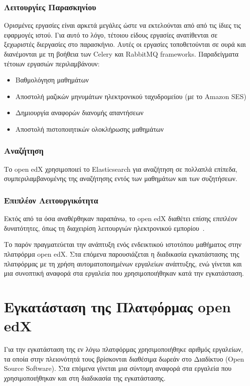 \documentclass[12pt]{report}
\begin{document}
\subsection{Λειτουργίες Παρασκηνίου}
Ορισμένες εργασίες είναι αρκετά μεγάλες ώστε να εκτελούνται από από τις ίδιες τις εφαρμογές ιστού. Για αυτό το λόγο, τέτοιου είδους εργασίες ανατίθενται σε ξεχωριστές διεργασίες στο παρασκήνιο. Αυτές οι εργασίες τοποθετούνται σε ουρά και διανέμονται με τη βοήθεια των \textlatin{Celery} και \textlatin{RabbitMQ frameworks}. Παραδείγματα τέτοιων εργασιών περιλαμβάνουν:
\begin{itemize}
  \item Βαθμολόγηση μαθημάτων
  \item Αποστολή μαζικών μηνυμάτων ηλεκτρονικού ταχυδρομείου (με το \textlatin{Amazon SES})
  \item Δημιουργία αναφορών διανομής απαντήσεων
  \item Αποστολή πιστοποιητικών ολοκλήρωσης μαθημάτων
\end{itemize}

\subsection{Αναζήτηση}
Το \textlatin{open edX} χρησιμοποιεί το \textlatin{Elasticsearch} για αναζήτηση σε πολλαπλά επίπεδα, συμπεριλαμβανομένης της αναζήτησης εντός των μαθημάτων και των συζητήσεων.

\subsection{Επιπλέον Λειτουργικότητα}
Εκτός από τα όσα αναθέρθηκαν παραπάνω, το \textlatin{open edX} διαθέτει επίσης επιπλέον δυνατότητες, όπως τη διαχειρίση λειτουργιών ηλεκτρονικού εμπορίου~\cite{edx_arch}.

Το παρόν πραγματεύεται την ανάπτυξη ενός ενδεικτικού ιστοτόπου μαθήματος στην πλατφόρμα \textlatin{open edX}. Στα επόμενα παρουσιάζεται η διαδικασία εγκατάστασης της πλατφόρμας με τη χρήση αυτοματοποιημένων εργαλείων ανάπτυξης, ενώ γίνεται και μια συνοπτική αναφορά στα εργαλεία που χρησιμοποιήθηκαν κατά την εγκατάσταση.

\chapter{Εγκατάσταση της Πλατφόρμας \textlatin{open edX}}\label{ch3}
Για την εγκατάσταση της εν λόγω πλατφόρμας χρησιμοποιήθηκε αριθμός εργαλείων, τα οποία στην πλειονότητά τους βρίσκονται διαθέσιμα δωρεάν στο Διαδίκτυο (\textlatin{Open Source Software}). Στα επόμενα γίνεται μια σύντομη αναφορά στα εργαλεία που χρησιμοποιήθηκαν και στη διαδικασία της εγκατάστασης.
\end{document}

